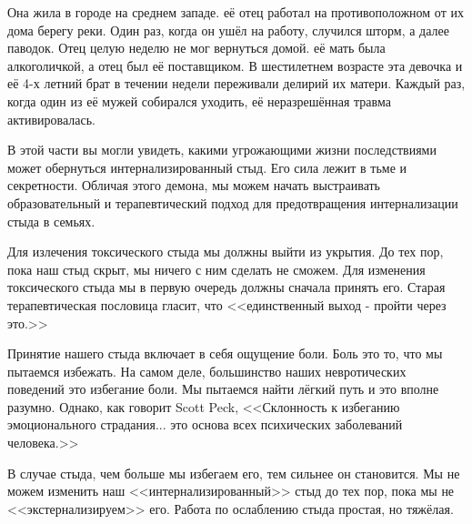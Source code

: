 \documentclass[10pt, fleqn]{article}
\begin{document}
Она жила в городе на среднем западе. её отец работал на противоположном от их дома берегу реки. Один раз, когда он ушёл на работу, случился шторм, а далее паводок. Отец целую неделю не мог вернуться домой. её мать была алкоголичкой, а отец был её поставщиком. В шестилетнем возрасте эта девочка и её 4-х летний брат в течении недели переживали делирий их матери. Каждый раз, когда один из её мужей собирался уходить, её неразрешённая травма активировалась.

В этой части вы могли увидеть, какими угрожающими жизни последствиями может обернуться интернализированный стыд. Его сила лежит в тьме и секретности. Обличая этого демона, мы можем начать выстраивать образовательный и терапевтический подход для предотвращения интернализации стыда в семьях.




Для излечения токсического стыда мы должны выйти из укрытия. До тех пор, пока наш стыд скрыт, мы ничего с ним сделать не сможем. Для изменения токсического стыда мы в первую очередь должны сначала принять его. Старая терапевтическая пословица гласит, что <<единственный выход - пройти через это.>>

Принятие нашего стыда включает в себя ощущение боли. Боль это то, что мы пытаемся избежать. На самом деле, большинство наших невротических поведений это избегание боли. Мы пытаемся найти лёгкий путь и это вполне разумно. Однако, как говорит Scott Peck, <<Склонность к избеганию эмоционального страдания... это основа всех психических заболеваний человека.>>

В случае стыда, чем больше мы избегаем его, тем сильнее он становится. Мы не можем изменить наш <<интернализированный>> стыд до тех пор, пока мы не <<экстернализируем>> его. Работа по ослаблению стыда простая, но тяжёлая.
\end{document}
